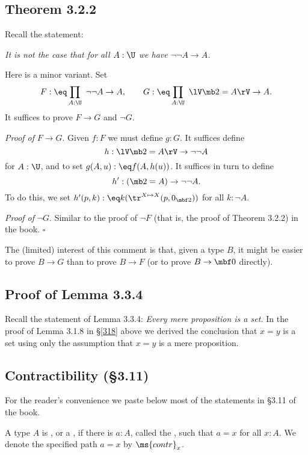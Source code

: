 \documentclass[12pt]{article}
\begin{document}

\subsection{Theorem 3.2.2} 

Recall the statement:

\nn\emph{It is not the case that for all $A:\U$ we have $\neg\neg A\to A$.}

Here is a minor variant. Set 
$$
F:\eq\prod_{A:\U}\ \neg\neg A\to A,\qquad G:\eq\prod_{A:\U}\ \lV\mb2=A\rV\to A.
$$ 
It suffices to prove $F\to G$ and $\neg G$. 

\nn\emph{Proof of} $F\to G$. Given $f:F$ we must define $g:G$. It suffices define 
$$
h:\lV\mb2=A\rV\to\neg\neg A
$$ 
for $A:\U$, and to set $g(A,u):\eq f(A,h(u))$. It suffices in turn to define 
$$
h':(\mb2=A)\to\neg\neg A.
$$ 
To do this, we set $h'(p,k):\eq k(\tr^{X\mapsto X}(p,0_{\mbf2}))$ for all $k:\neg A$. 

\nn\emph{Proof of} $\neg G$. Similar to the proof of $\neg F$ (that is, the proof of Theorem 3.2.2) in the book. $\square$

The (limited) interest of this comment is that, given a type $B$, it might be easier to prove $B\to G$ than to prove $B\to F$ (or to prove $B\to\mbf0$ directly). 


\subsection{Proof of Lemma 3.3.4}%

Recall the statement of Lemma 3.3.4: \emph{Every mere proposition is a set.} In the proof of Lemma 3.1.8 in \S\ref{318} above we derived the conclusion that $x=y$ is a set using only the assumption that $x=y$ is a mere proposition.


\subsection{Contractibility (\S3.11)}\label{311}


For the reader's convenience we paste below most of the statements in \S3.11 of the book.

\nn{} A type $A$ is , or a , if there is $a:A$, called the , such that $a=x$ for all $x:A$. We denote the specified path $a=x$ by $\ms{contr}_x$.
\end{document}
